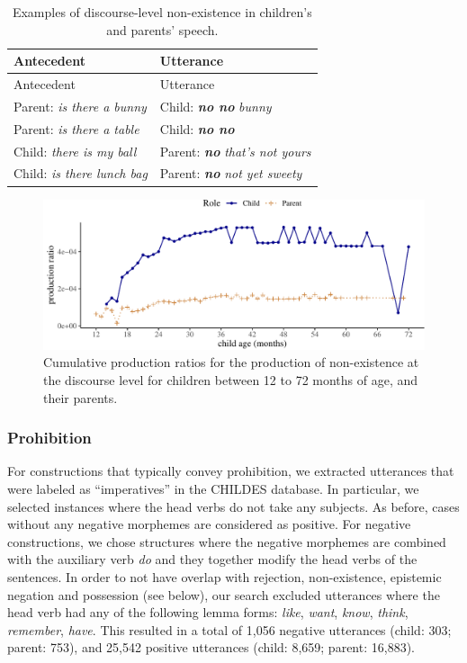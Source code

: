 \documentclass[
  man,floatsintext]{apa6}
\begin{document}
\begin{longtable}[]{@{}ll@{}}
\caption{\label{tab:disexist} Examples of discourse-level non-existence in children's and parents' speech.}\tabularnewline
\toprule\noalign{}
Antecedent & Utterance \\
\midrule\noalign{}
\endfirsthead
\toprule\noalign{}
Antecedent & Utterance \\
\midrule\noalign{}
\endhead
\bottomrule\noalign{}
\endlastfoot
Parent: \emph{is there a bunny} & Child: \textbf{\emph{no no}} \emph{bunny} \\
Parent: \emph{is there a table} & Child: \textbf{\emph{no no}} \\
Child: \emph{there is my ball} & Parent: \textbf{\emph{no}} \emph{that's not yours} \\
Child: \emph{is there lunch bag} & Parent: \textbf{\emph{no}} \emph{not yet sweety} \\
\end{longtable}

\begin{figure}[H]

{\centering \includegraphics{neg_construction_article_files/figure-latex/existencediscourse-1} 

}

\caption{Cumulative production ratios for the production of non-existence at the discourse level for children between 12 to 72 months of age, and their parents.}\label{fig:existencediscourse}
\end{figure}

\subsubsection{Prohibition}\label{prohibition}

For constructions that typically convey prohibition, we extracted utterances that were labeled as ``imperatives'' in the CHILDES database. In particular, we selected instances where the head verbs do not take any subjects. As before, cases without any negative morphemes are considered as positive. For negative constructions, we chose structures where the negative morphemes are combined with the auxiliary verb \emph{do} and they together modify the head verbs of the sentences. In order to not have overlap with rejection, non-existence, epistemic negation and possession (see below), our search excluded utterances where the head verb had any of the following lemma forms: \emph{like}, \emph{want}, \emph{know}, \emph{think}, \emph{remember}, \emph{have}. This resulted in a total of 1,056 negative utterances (child: 303; parent: 753), and 25,542 positive utterances (child: 8,659; parent: 16,883).
\end{document}

